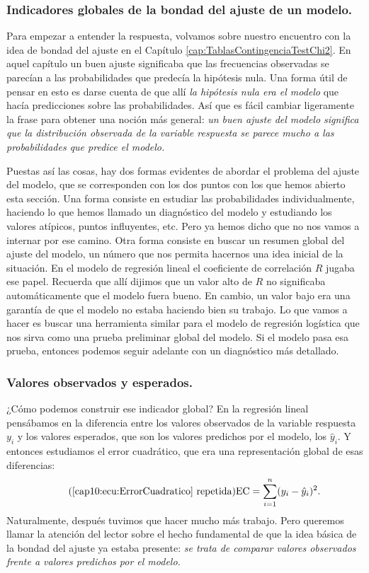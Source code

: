 \subsubsection*{Indicadores globales de la bondad del ajuste de un modelo.}

Para empezar a entender la respuesta, volvamos sobre nuestro encuentro con la idea de bondad del ajuste en el Capítulo \ref{cap:TablasContingenciaTestChi2}. En aquel capítulo un buen ajuste significaba que las frecuencias observadas se parecían a las probabilidades que predecía la hipótesis nula. Una forma útil de pensar en esto es darse cuenta de que allí  {\em la hipótesis nula era el modelo} que hacía predicciones sobre las probabilidades.  Así que es fácil cambiar ligeramente la frase para obtener una noción más general: {\em un buen ajuste del modelo  significa que la distribución observada de la variable respuesta se parece mucho a las probabilidades que predice el modelo.}

Puestas así las cosas, hay dos formas evidentes de abordar el problema del ajuste del modelo, que se corresponden con los dos puntos con los que hemos abierto esta sección. Una forma consiste en estudiar las probabilidades individualmente, haciendo lo que hemos llamado un diagnóstico del modelo y estudiando los valores atípicos, puntos influyentes, etc. Pero ya hemos dicho que no nos vamos a internar por ese camino. Otra forma consiste en buscar un resumen global del ajuste del modelo, un  número que nos permita hacernos una idea inicial de la situación. En el modelo de regresión lineal el coeficiente de correlación $R$ jugaba ese papel. Recuerda que allí dijimos que un valor alto de $R$ no significaba automáticamente que el modelo fuera bueno. En cambio, un valor bajo era una garantía de que el modelo no estaba haciendo bien su trabajo. Lo que vamos a hacer es buscar una herramienta similar para el modelo de regresión logística que nos sirva como una prueba preliminar global del modelo. Si el modelo pasa esa prueba, entonces podemos seguir adelante con un diagnóstico más detallado.

\subsubsection*{Valores observados y esperados.}

¿Cómo podemos construir ese indicador global? En la regresión lineal pensábamos en la diferencia entre los valores observados de la variable respuesta $y_i$ y los valores esperados, que son los valores predichos por el modelo, los $\hat y_i$. Y entonces estudiamos el error cuadrático, que era una representación global de esas diferencias:
\begin{equation}\tag{\ref{cap10:ecu:ErrorCuadratico} repetida}
\mbox{EC} = \sum_{i=1}^n(y_i-\hat y_i)^2.
\end{equation}
Naturalmente, después tuvimos que hacer mucho más trabajo. Pero queremos llamar la atención del lector sobre el hecho fundamental de que la idea básica de la bondad del ajuste ya estaba presente: {\em se trata de comparar valores observados frente a valores predichos por el modelo.}

